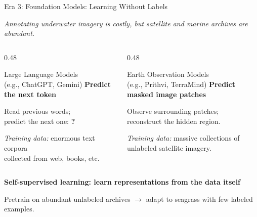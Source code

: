 \documentclass[aspectratio=169,10pt]{beamer}
\begin{document}
\begin{frame}{Era 3: Foundation Models: Learning Without Labels}
  \vspace{-0.15cm}
  \begin{center}
    \small \textit{Annotating underwater imagery is costly, but satellite and marine archives are abundant.}
  \end{center}
  \vspace{0.05cm}

  \begin{columns}[T,onlytextwidth]
    \begin{column}{0.48\textwidth}
      \begin{block}{Large Language Models\\{\footnotesize(e.g., ChatGPT, Gemini)}}
        \centering
        \textbf{Predict the next token}

        \vspace{0.08cm}
        Read previous words;\\
        predict the next one: \textcolor{OceanTeal}{\textbf{?}}

        \vspace{0.08cm}
        \footnotesize
        \textit{Training data:} enormous text corpora\\
        collected from web, books, etc.
      \end{block}
    \end{column}

    \begin{column}{0.48\textwidth}
      \begin{exampleblock}{Earth Observation Models\\{\footnotesize(e.g., Prithvi, TerraMind)}}
        \centering
        \textbf{Predict masked image patches}

        \vspace{0.08cm}
        Observe surrounding patches;\\
        reconstruct the hidden region.

        \vspace{0.08cm}
        \footnotesize
        \textit{Training data:} massive collections of\\
        unlabeled satellite imagery.
      \end{exampleblock}
    \end{column}
  \end{columns}

  \vspace{0.2cm}
  \begin{center}
    {\normalsize \textbf{\color{OceanDark}Self-supervised learning: learn representations from the data itself}}\par
    \vspace{1.5pt}
    {\footnotesize Pretrain on abundant unlabeled archives $\rightarrow$ adapt to seagrass with few labeled examples.\par}
  \end{center}

\end{frame}
\end{document}
